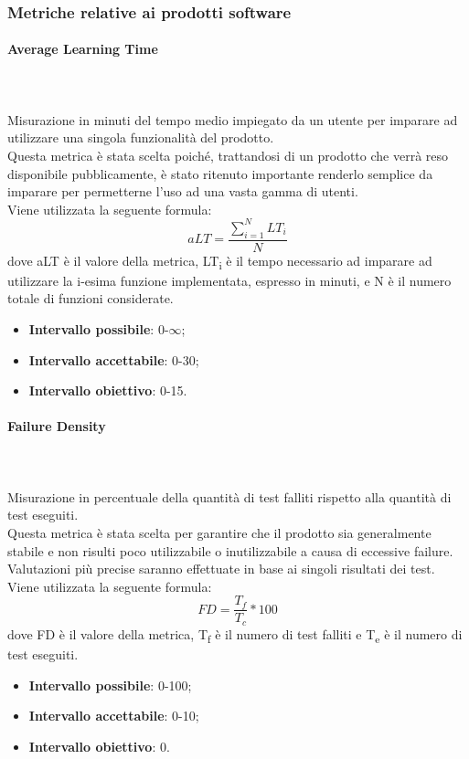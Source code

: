 \subsubsection{Metriche relative ai prodotti software}
\paragraph{Average Learning Time}  ~\\ ~\\
Misurazione in minuti del tempo medio impiegato da un utente per imparare ad utilizzare una singola funzionalità del prodotto.
\\Questa metrica è stata scelta poiché, trattandosi di un prodotto che verrà reso disponibile pubblicamente, è stato ritenuto importante renderlo semplice da imparare per permetterne l'uso ad una vasta gamma di utenti.
\\Viene utilizzata la seguente formula:
$$aLT=\frac{\sum\limits_{i=1}^N{LT_i}}{N}$$
dove aLT è il valore della metrica, LT\textsubscript{i} è il tempo necessario ad imparare ad utilizzare la i-esima funzione implementata, espresso in minuti, e N è il numero totale di funzioni considerate.
\begin{itemize}
	\item{\textbf{Intervallo possibile}: 0-$\infty$;}
	\item{\textbf{Intervallo accettabile}: 0-30;}
	\item{\textbf{Intervallo obiettivo}: 0-15.}
\end{itemize}

\paragraph{Failure Density}  ~\\ ~\\
Misurazione in percentuale della quantità di test falliti rispetto alla quantità di test eseguiti.
\\Questa metrica è stata scelta per garantire che il prodotto sia generalmente stabile e non risulti poco utilizzabile o inutilizzabile a causa di eccessive failure. Valutazioni più precise saranno effettuate in base ai singoli risultati dei test.\\
Viene utilizzata la seguente formula:
$$FD=\frac{T_f}{T_c}*100$$
dove FD è il valore della metrica, T\textsubscript{f} è il numero di test falliti e T\textsubscript{e} è il numero di test eseguiti.
\begin{itemize}
	\item{\textbf{Intervallo possibile}: 0-100;}
	\item{\textbf{Intervallo accettabile}: 0-10;}
	\item{\textbf{Intervallo obiettivo}: 0.}
\end{itemize}

\pagebreak
\pagebreak